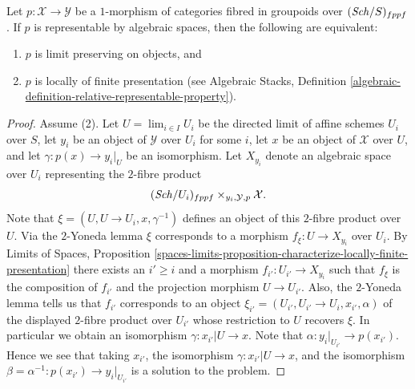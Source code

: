 \begin{lemma}
\label{lemma-representable-by-spaces-limit-preserving}
Let $p : \mathcal{X} \to \mathcal{Y}$ be a $1$-morphism of categories
fibred in groupoids over $(\mathit{Sch}/S)_{fppf}$. If $p$ is
representable by algebraic spaces, then the following are equivalent:
\begin{enumerate}
\item $p$ is limit preserving on objects, and
\item $p$ is locally of finite presentation (see
Algebraic Stacks,
Definition \ref{algebraic-definition-relative-representable-property}).
\end{enumerate}
\end{lemma}

\begin{proof}
Assume (2). Let $U = \lim_{i \in I} U_i$ be the directed limit
of affine schemes $U_i$ over $S$, let $y_i$ be an object of $\mathcal{Y}$
over $U_i$ for some $i$, let $x$ be an object of $\mathcal{X}$ over $U$,
and let $\gamma : p(x) \to y_i|_U$ be an isomorphism. Let
$X_{y_i}$ denote an algebraic space over $U_i$ representing the $2$-fibre
product
$$
(\mathit{Sch}/U_i)_{fppf} \times_{y_i, \mathcal{Y}, p} \mathcal{X}.
$$
Note that $\xi = (U, U \to U_i, x, \gamma^{-1})$ defines an object of
this $2$-fibre product over $U$. Via the $2$-Yoneda lemma $\xi$ corresponds
to a morphism $f_\xi : U \to X_{y_i}$ over $U_i$. By
Limits of Spaces, Proposition
\ref{spaces-limits-proposition-characterize-locally-finite-presentation}
there exists an $i' \geq i$ and a morphism $f_{i'} : U_{i'} \to X_{y_i}$
such that $f_\xi$ is the composition of $f_{i'}$ and the projection
morphism $U \to U_{i'}$. Also, the $2$-Yoneda lemma tells us that
$f_{i'}$ corresponds to an object
$\xi_{i'} = (U_{i'}, U_{i'} \to U_i, x_{i'}, \alpha)$ of
the displayed $2$-fibre product over $U_{i'}$ whose restriction to
$U$ recovers $\xi$. In particular we obtain an isomorphism
$\gamma : x_{i'}|U \to x$. Note that $\alpha : y_i|_{U_{i'}} \to p(x_{i'})$.
Hence we see that taking $x_{i'}$, the isomorphism
$\gamma : x_{i'}|U \to x$, and the isomorphism
$\beta = \alpha^{-1} : p(x_{i'}) \to y_i|_{U_{i'}}$
is a solution to the problem.


\end{proof}

